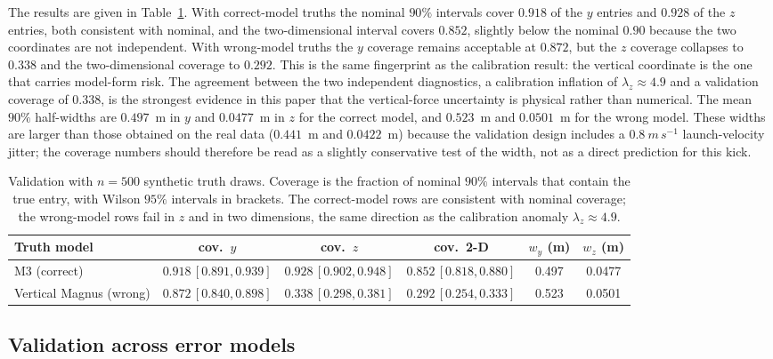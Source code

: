 The results are given in Table~\ref{tab:validation}. With correct-model truths the
nominal $90\%$ intervals cover $0.918$ of the $y$ entries and $0.928$ of the $z$
entries, both consistent with nominal, and the two-dimensional interval covers
$0.852$, slightly below the nominal $0.90$ because the two coordinates are not
independent. With wrong-model truths the $y$ coverage remains acceptable at
$0.872$, but the $z$ coverage collapses to $0.338$ and the two-dimensional
coverage to $0.292$. This is the same fingerprint as the calibration result:
the vertical coordinate is the one that carries model-form risk. The agreement
between the two independent diagnostics, a calibration inflation of
$\lambda_z\approx4.9$ and a validation coverage of $0.338$, is the strongest
evidence in this paper that the vertical-force uncertainty is physical rather
than numerical. The mean $90\%$ half-widths are $0.497$~m in $y$ and
$0.0477$~m in $z$ for the correct model, and $0.523$~m and $0.0501$~m for the
wrong model. These widths are larger than those obtained on the real data
($0.441$~m and $0.0422$~m) because the validation design includes a
$0.8~\si{m\,s^{-1}}$ launch-velocity jitter; the coverage numbers should
therefore be read as a slightly conservative test of the width, not as a direct
prediction for this kick.

\begin{table}[t]
  \centering
  \caption{Validation with $n=500$ synthetic truth draws. Coverage is the
  fraction of nominal $90\%$ intervals that contain the true entry, with Wilson
  $95\%$ intervals in brackets. The correct-model rows are consistent with
  nominal coverage; the wrong-model rows fail in $z$ and in two dimensions, the
  same direction as the calibration anomaly $\lambda_z\approx4.9$.}
  \label{tab:validation}
  \footnotesize
  \begin{tabular}{@{}lccccc@{}}
    \toprule
    Truth model & cov.\ $y$ & cov.\ $z$ & cov.\ 2-D & $w_y$ (m) & $w_z$ (m) \\
    \midrule
    M3 (correct) & $0.918\,[0.891,0.939]$ & $0.928\,[0.902,0.948]$ & $0.852\,[0.818,0.880]$ & 0.497 & 0.0477 \\
    Vertical Magnus (wrong) & $0.872\,[0.840,0.898]$ & $0.338\,[0.298,0.381]$ & $0.292\,[0.254,0.333]$ & 0.523 & 0.0501 \\
    \bottomrule
  \end{tabular}
\end{table}

\subsection{Validation across error models}
\label{sec:errormodels}


